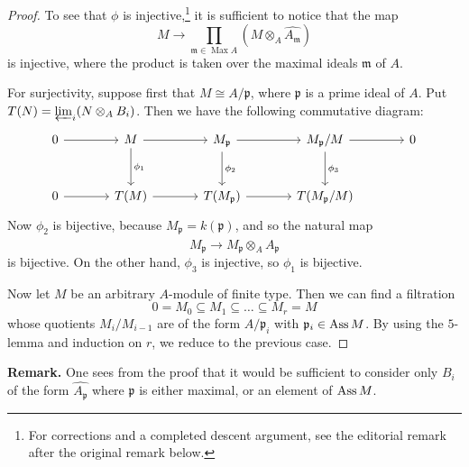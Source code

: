 \begin{proof}
To see that $\phi$ is injective,\footnote{For corrections and a completed descent argument, see the editorial remark after the original remark below.} it is sufficient to notice that the map
\[
M \longrightarrow \prod_{\mathfrak m\in\operatorname{Max}A}(M\otimes_A\widehat{A_{\mathfrak m}})
\]
is injective, where the product is taken over the maximal ideals $\mathfrak{m}$ of $A$.

For surjectivity, suppose first that $M \cong A/\mathfrak{p}$, where $\mathfrak{p}$ is a prime ideal of $A$. Put $T(N)=\varprojlim_i(N\otimes_A B_i)$. Then we have the following commutative diagram:
\[
\begin{tikzcd}[row sep=large,column sep=large]
0 \ar[r] & M \ar[r] \ar[d,"\phi_1"]
 & M_{\mathfrak p} \ar[r] \ar[d,"\phi_2"]
 & M_{\mathfrak p}/M \ar[r] \ar[d,"\phi_3"] & 0 \\
0 \ar[r] & T(M) \ar[r] & T(M_{\mathfrak p}) \ar[r]
 & T(M_{\mathfrak p}/M)
\end{tikzcd}
\]
Now $\phi_{2}$ is bijective, because $M_{\mathfrak{p}} = k(\mathfrak{p})$, and so the natural map
\[
M_{\mathfrak{p}}\rightarrow M_{\mathfrak{p}}\otimes_{A}\widehat{A_{\mathfrak p}}
\]
is bijective. On the other hand, $\phi_{3}$ is injective, so $\phi_{1}$ is bijective.

Now let $M$ be an arbitrary $A$-module of finite type. Then we can find a filtration
\[
0 = M_{0} \subseteq M_{1} \subseteq \dots \subseteq M_{r} = M
\]
whose quotients $M_{i}/M_{i-1}$ are of the form $A/\mathfrak{p}_{i}$ with $\mathfrak{p}_{i} \in \operatorname{Ass} M$. By using the $5$-lemma and induction on $r$, we reduce to the previous case.
\end{proof}

\par\medskip\noindent\textbf{Remark.}
One sees from the proof that it would be sufficient to consider only $B_{i}$ of the form $\widehat{A_{\mathfrak p}}$ where $\mathfrak{p}$ is either maximal, or an element of $\operatorname{Ass} M$.
\par\medskip

